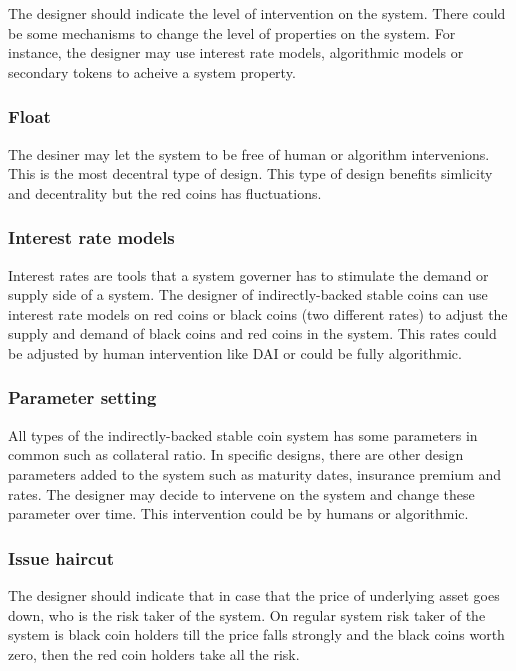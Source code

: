 The designer should indicate the level of intervention on the system. There could be some mechanisms to change the level of properties on the system. For instance, the designer may use interest rate models, algorithmic models or secondary tokens to acheive a system property.

\subsubsection{Float}

The desiner may let the system to be free of human or algorithm intervenions. This is the most decentral type of design. This type of design benefits simlicity and decentrality but the red coins has fluctuations.

\subsubsection{Interest rate models}

Interest rates are tools that a system governer has to stimulate the demand or supply side of a system. The designer of indirectly-backed stable coins can use interest rate models on red coins or black coins (two different rates) to adjust the supply and demand of black coins and red coins in the system. This rates could be adjusted by human intervention like DAI or could be fully algorithmic.

\subsubsection{Parameter setting}

All types of the indirectly-backed stable coin system has some parameters in common such as collateral ratio. In specific designs, there are other design parameters added to the system such as maturity dates, insurance premium and rates. The designer may decide to intervene on the system and change these parameter over time. This intervention could be by humans or algorithmic. 

\subsubsection{Issue haircut}

The designer should indicate that in case that the price of underlying asset goes down, who is the risk taker of the system. On regular system risk taker of the system is black coin holders till the price falls strongly and the black coins worth zero, then the red coin holders take all the risk.

